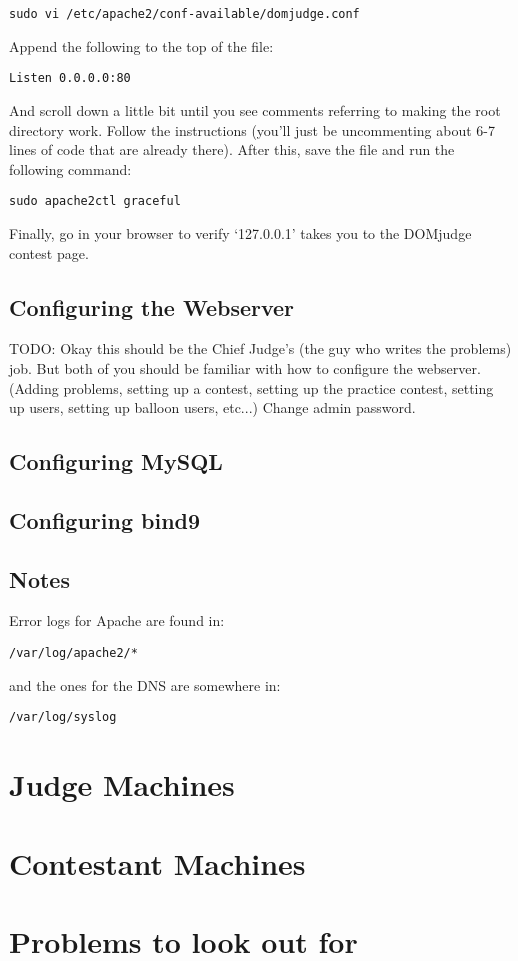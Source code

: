 \documentclass[a4paper,11pt]{article}
\begin{document}
\begin{verbatim}
sudo vi /etc/apache2/conf-available/domjudge.conf
\end{verbatim}
Append the following to the top of the file:
\begin{verbatim}
Listen 0.0.0.0:80
\end{verbatim}
And scroll down a little bit until you see comments referring to making the root directory work. Follow the instructions (you'll just be uncommenting about 6-7 lines of code that are already there). After this, save the file and run the following command:
\begin{verbatim}
sudo apache2ctl graceful
\end{verbatim}
Finally, go in your browser to verify `127.0.0.1' takes you to the DOMjudge contest page.
\subsection{Configuring the Webserver}
TODO: Okay this should be the Chief Judge's (the guy who writes the problems) job. But both of you should be familiar with how to configure the webserver. (Adding problems, setting up a contest, setting up the practice contest, setting up users, setting up balloon users, etc...) Change admin password.
\subsection{Configuring MySQL}
\subsection{Configuring bind9}
\subsection{Notes}
Error logs for Apache are found in:
\begin{verbatim}
/var/log/apache2/*
\end{verbatim}
and the ones for the DNS are somewhere in:
\begin{verbatim}
/var/log/syslog
\end{verbatim}
\section{Judge Machines}

\section{Contestant Machines}

\section{Problems to look out for}
\end{document}
